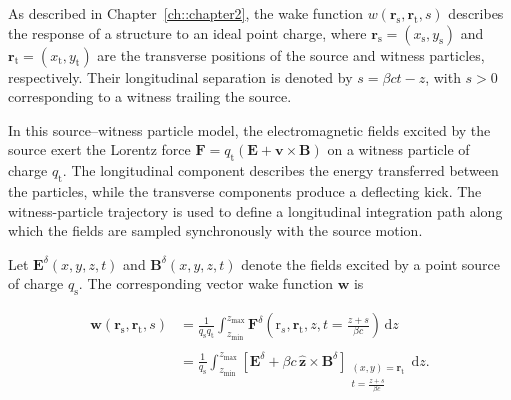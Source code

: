 As described in Chapter~\ref{ch::chapter2}, the wake function $w(\mathbf{r}_{\mathrm{s}},\mathbf{r}_{\mathrm{t}},s)$ describes the response of a structure to an ideal point charge, where $\mathbf{r}_{\mathrm{s}}=(x_{\mathrm{s}},y_{\mathrm{s}})$ and $\mathbf{r}_{\mathrm{t}}=(x_{\mathrm{t}},y_{\mathrm{t}})$ are the transverse positions of the source and witness particles, respectively. Their longitudinal separation is denoted by $s=\beta c t - z$, with $s>0$ corresponding to a witness trailing the source.

In this source--witness particle model, the electromagnetic fields excited by the source exert the Lorentz force $\mathbf{F}=q_{\mathrm{t}}\left(\mathbf{E}+\mathbf{v}\times\mathbf{B}\right)$ on a witness particle of charge $q_{\mathrm{t}}$. The longitudinal component describes the energy transferred between the particles, while the transverse components produce a deflecting kick. The witness-particle trajectory is used to define a longitudinal integration path along which the fields are sampled synchronously with the source motion.

Let $\mathbf{E}^{\delta}(x,y,z,t)$ and $\mathbf{B}^{\delta}(x,y,z,t)$ denote the fields excited by a point source of charge $q_{\mathrm{s}}$. The corresponding vector wake function $\boldsymbol{w}$ is

\begin{equation}
\begin{aligned}
\boldsymbol{w}
\left(
\mathbf{r}_{\mathrm{s}},\mathbf{r}_{\mathrm{t}},s
\right)
&=
\frac{1}{q_{\mathrm{s}}q_{\mathrm{t}}}
\int_{z_{\min}}^{z_{\max}}
\mathbf{F}^{\delta}
\left(\mathrm{r}_s,
\mathbf{r}_{\mathrm{t}},z,
t=\frac{z+s}{\beta c}
\right)
\,\mathrm{d}z
\\ \\
&=
\frac{1}{q_{\mathrm{s}}}
\int_{z_{\min}}^{z_{\max}}
\left[
\mathbf{E}^{\delta}
+
\beta c\,\widehat{\mathbf{z}}\times\mathbf{B}^{\delta}
\right]_{
\substack{
(x,y)=\mathbf{r}_{\mathrm{t}}\\ t=\frac{z+s}{\beta c} }}
\,\mathrm{d}z.
\end{aligned}
\label{eq:point_charge_wake_field_integration}
\end{equation}

